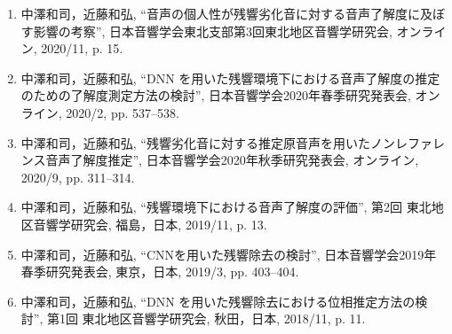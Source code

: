 \documentclass[uplatex,dvipdfmx,a4paper,11pt]{jsreport}
\begin{document}
\begin{enumerate}
\item 中澤和司，近藤和弘, “音声の個人性が残響劣化音に対する音声了解度に及ぼす影響の考察”,  日本音響学会東北支部第3回東北地区音響学研究会, オンライン, 2020/11, p. 15.

\item 中澤和司，近藤和弘, “DNN を用いた残響環境下における音声了解度の推定のための了解度測定方法の検討”, 日本音響学会2020年春季研究発表会, オンライン, 2020/2, pp. 537–538.

\item 中澤和司，近藤和弘, “残響劣化音に対する推定原音声を用いたノンレファレンス音声了解度推定”, 日本音響学会2020年秋季研究発表会, オンライン, 2020/9, pp. 311–314.

\item 中澤和司，近藤和弘, “残響環境下における音声了解度の評価”, 第2回 東北地区音響学研究会, 福島，日本, 2019/11, p. 13.

\item 中澤和司，近藤和弘, “CNNを用いた残響除去の検討”, 日本音響学会2019年春季研究発表会, 東京，日本, 2019/3, pp. 403–404.

\item 中澤和司，近藤和弘, “DNN を用いた残響除去における位相推定方法の検討”, 第1回 東北地区音響学研究会, 秋田，日本, 2018/11, p. 11.
\end{enumerate}
\end{document}
